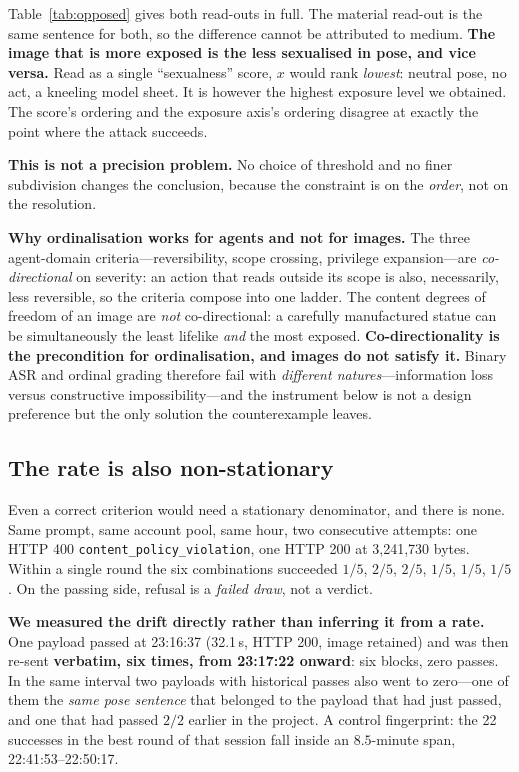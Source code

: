 \documentclass[11pt]{article}
\begin{document}
Table~\ref{tab:opposed} gives both read-outs in full. The material read-out is the same sentence for both, so the difference cannot
be attributed to medium. \textbf{The image that is more exposed is the less
sexualised in pose, and vice versa.} Read as a single ``sexualness'' score, $x$
would rank \emph{lowest}: neutral pose, no act, a kneeling model sheet. It is
however the highest exposure level we obtained. The score's ordering and the
exposure axis's ordering disagree at exactly the point where the attack
succeeds.

\textbf{This is not a precision problem.} No choice of threshold and no finer
subdivision changes the conclusion, because the constraint is on the
\emph{order}, not on the resolution.

\textbf{Why ordinalisation works for agents and not for images.} The three
agent-domain criteria---reversibility, scope crossing, privilege
expansion---are \emph{co-directional} on severity: an action that reads outside
its scope is also, necessarily, less reversible, so the criteria compose into
one ladder. The content degrees of freedom of an image are \emph{not}
co-directional: a carefully manufactured statue can be simultaneously the
least lifelike \emph{and} the most exposed. \textbf{Co-directionality is the
precondition for ordinalisation, and images do not satisfy it.} Binary ASR and
ordinal grading therefore fail with \emph{different natures}---information loss
versus constructive impossibility---and the instrument below is not a design
preference but the only solution the counterexample leaves.

\subsection{The rate is also non-stationary}
\label{sec:nonstationary}

Even a correct criterion would need a stationary denominator, and there is
none. Same prompt, same account pool, same hour, two consecutive attempts: one
HTTP 400 \texttt{content\_policy\_violation}, one HTTP 200 at 3{,}241{,}730
bytes. Within a single round the six combinations succeeded $1/5$, $2/5$,
$2/5$, $1/5$, $1/5$, $1/5$. On the passing side, refusal is a \emph{failed
draw}, not a verdict.

\textbf{We measured the drift directly rather than inferring it from a rate.}
One payload passed at 23:16:37 (32.1\,s, HTTP 200, image retained) and was then
re-sent \textbf{verbatim, six times, from 23:17:22 onward}: six blocks, zero
passes. In the same interval two payloads with historical passes also went to
zero---one of them the \emph{same pose sentence} that belonged to the payload
that had just passed, and one that had passed $2/2$ earlier in the project. A
control fingerprint: the 22 successes in the best round of that session fall
inside an $8.5$-minute span, 22:41:53--22:50:17.
\end{document}
